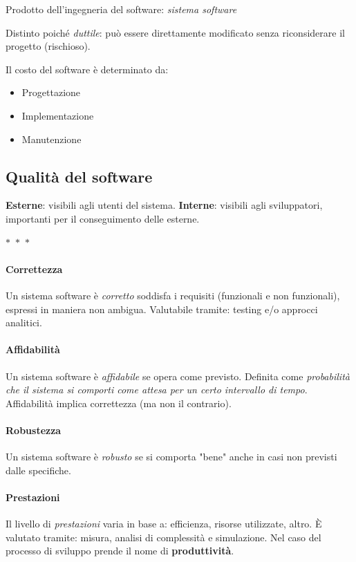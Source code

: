 Prodotto dell'ingegneria del software: \textit{sistema software}

Distinto poiché \textit{duttile}: può essere direttamente modificato senza riconsiderare il progetto (rischioso).

Il costo del software è determinato da:
\begin{itemize}
    \item Progettazione
    \item Implementazione
    \item Manutenzione
\end{itemize}

\subsection{Qualità del software}

\textbf{Esterne}: visibili agli utenti del sistema.
\textbf{Interne}: visibili agli sviluppatori, importanti per il conseguimento delle esterne.

\begin{center}
  $\ast$~$\ast$~$\ast$
\end{center}

\paragraph{Correttezza} Un sistema software è \textit{corretto} soddisfa i requisiti (funzionali e non funzionali), espressi in maniera non ambigua. Valutabile tramite: testing e/o approcci analitici.

\paragraph{Affidabilità} Un sistema software è \textit{affidabile} se opera come previsto. Definita come \textit{probabilità che il sistema si comporti come attesa per un certo intervallo di tempo}. Affidabilità implica correttezza (ma non il contrario).

\paragraph{Robustezza} Un sistema software è \textit{robusto} se si comporta "bene" anche in casi non previsti dalle specifiche.

\paragraph{Prestazioni} Il livello di \textit{prestazioni} varia in base a: efficienza, risorse utilizzate, altro. È valutato tramite: misura, analisi di complessità e simulazione. Nel caso del processo di sviluppo prende il nome di \textbf{produttività}.


